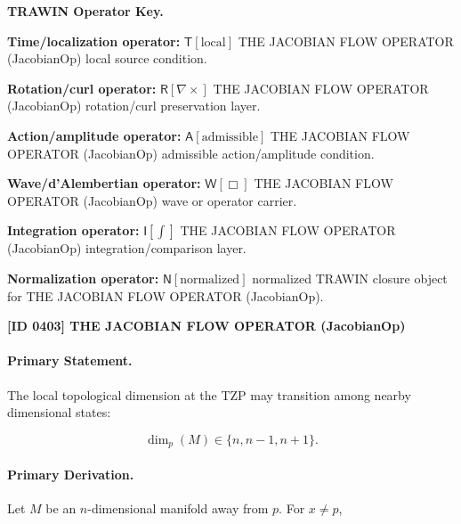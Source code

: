 \par\vspace{0.45\baselineskip}
\noindent\begin{minipage}[t]{\linewidth}
\begingroup
\small
\raggedright
\textbf{TRAWIN Operator Key.}\par
\noindent\textbf{Time/localization operator:} $\mathsf{T}\!\left[\mathrm{local}\right]$ THE JACOBIAN FLOW OPERATOR (JacobianOp) local source condition.\par
\noindent\textbf{Rotation/curl operator:} $\mathsf{R}\!\left[\nabla\times\right]$ THE JACOBIAN FLOW OPERATOR (JacobianOp) rotation/curl preservation layer.\par
\noindent\textbf{Action/amplitude operator:} $\mathsf{A}\!\left[\mathrm{admissible}\right]$ THE JACOBIAN FLOW OPERATOR (JacobianOp) admissible action/amplitude condition.\par
\noindent\textbf{Wave/d'Alembertian operator:} $\mathsf{W}\!\left[\Box\right]$ THE JACOBIAN FLOW OPERATOR (JacobianOp) wave or operator carrier.\par
\noindent\textbf{Integration operator:} $\mathsf{I}\!\left[\int\right]$ THE JACOBIAN FLOW OPERATOR (JacobianOp) integration/comparison layer.\par
\noindent\textbf{Normalization operator:} $\mathsf{N}\!\left[\mathrm{normalized}\right]$ normalized TRAWIN closure object for THE JACOBIAN FLOW OPERATOR (JacobianOp).\par
\endgroup
\end{minipage}

\clearpage
\noindent\textbf{[ID 0403] THE JACOBIAN FLOW OPERATOR (JacobianOp)}\par
\vspace{0.35em}
\paragraph{Primary Statement.}
The local topological dimension at the TZP may transition among nearby dimensional states:

\begin{equation}
\dim_p(M)\in\{n,n-1,n+1\}.
\end{equation}

\paragraph{Primary Derivation.}
Let $M$ be an $n$-dimensional manifold away from $p$. For $x\neq p$,

